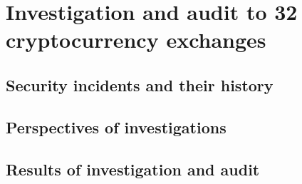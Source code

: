 \section{Investigation and audit to 32 cryptocurrency exchanges}
\subsection{Security incidents and their history}
\subsection{Perspectives of investigations}
\subsection{Results of investigation and audit}
